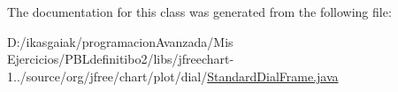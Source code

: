 The documentation for this class was generated from the following file\+:\begin{DoxyCompactItemize}
\item 
D\+:/ikasgaiak/programacion\+Avanzada/\+Mis Ejercicios/\+P\+B\+Ldefinitibo2/libs/jfreechart-\/1../source/org/jfree/chart/plot/dial/\mbox{\hyperlink{_standard_dial_frame_8java}{Standard\+Dial\+Frame.\+java}}\end{DoxyCompactItemize}
